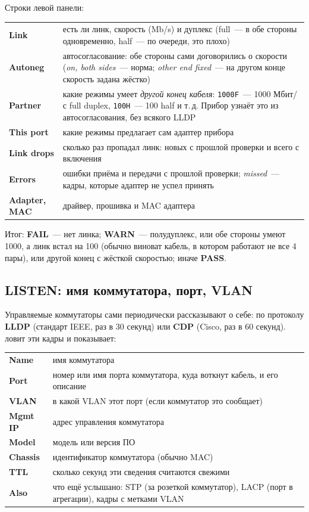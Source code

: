 \documentclass[a4paper,11pt]{article}
\newcommand{\btn}[1]{\mbox{\fcolorbox{gray!55}{gray!12}{\footnotesize\bfseries #1}}}
\begin{document}
Строки левой панели:

\begin{center}
\small
\begin{tabularx}{\textwidth}{>{\bfseries}lX}
\toprule
Link & есть ли линк, скорость (Mb/s) и дуплекс (full~--- в обе стороны одновременно, half~--- по очереди, это плохо) \\
Autoneg & автосогласование: обе стороны сами договорились о скорости (\emph{on, both sides}~--- норма; \emph{other end fixed}~--- на другом конце скорость задана жёстко) \\
Partner & какие режимы умеет \emph{другой конец кабеля}: \texttt{1000F}~--- 1000 Мбит/с full duplex, \texttt{100H}~--- 100 half и т.\,д. Прибор узнаёт это из автосогласования, без всякого LLDP \\
This port & какие режимы предлагает сам адаптер прибора \\
Link drops & сколько раз пропадал линк: новых с прошлой проверки и всего с включения \\
Errors & ошибки приёма и передачи с прошлой проверки; \emph{missed}~--- кадры, которые адаптер не успел принять \\
Adapter, MAC & драйвер, прошивка и MAC адаптера \\
\bottomrule
\end{tabularx}
\end{center}

Итог: \textbf{FAIL}~--- нет линка; \textbf{WARN}~--- полудуплекс, или обе стороны умеют 1000, а линк встал
на 100 (обычно виноват кабель, в котором работают не все 4 пары), или другой конец с жёсткой скоростью;
иначе \textbf{PASS}.

\subsection{LISTEN: имя коммутатора, порт, VLAN}

Управляемые коммутаторы сами периодически рассказывают о себе: по протоколу \textbf{LLDP} (стандарт IEEE,
раз в 30 секунд) или \textbf{CDP} (Cisco, раз в 60 секунд). \btn{LISTEN} ловит эти кадры и показывает:

\begin{center}
\small
\begin{tabularx}{\textwidth}{>{\bfseries}lX}
\toprule
Name & имя коммутатора \\
Port & номер или имя порта коммутатора, куда воткнут кабель, и его описание \\
VLAN & в какой VLAN этот порт (если коммутатор это сообщает) \\
Mgmt IP & адрес управления коммутатора \\
Model & модель или версия ПО \\
Chassis & идентификатор коммутатора (обычно MAC) \\
TTL & сколько секунд эти сведения считаются свежими \\
Also & что ещё услышано: STP (за розеткой коммутатор), LACP (порт в агрегации), кадры с метками VLAN \\
\bottomrule
\end{tabularx}
\end{center}
\end{document}

